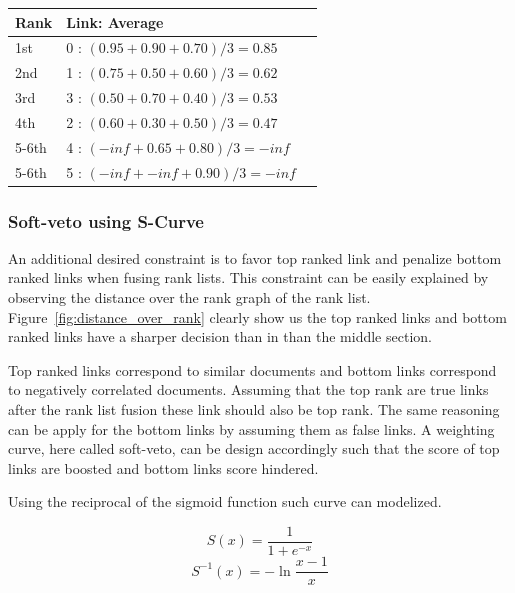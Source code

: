 \begin{table}
  \begin{tabular}{l l l}
    \toprule
    Rank & Link: Average \\
    \midrule
    1st & 0 : $(0.95 + 0.90 + 0.70)/3 = 0.85$ \\
    2nd & 1 : $(0.75 + 0.50 + 0.60)/3 = 0.62$ \\
    3rd & 3 : $(0.50 + 0.70 + 0.40)/3 = 0.53$ \\
    4th & 2 : $(0.60 + 0.30 + 0.50)/3 = 0.47$ \\
    5-6th & 4 : $(-inf + 0.65 + 0.80)/3 = -inf$ \\
    5-6th & 5 : $(-inf + -inf + 0.90)/3 = -inf$ \\
    \bottomrule
  \end{tabular}
\end{table}

\subsubsection{Soft-veto using S-Curve}

An additional desired constraint is to favor top ranked link and penalize bottom ranked links when fusing rank lists.
This constraint can be easily explained by observing the distance over the rank graph of the rank list.
Figure~\ref{fig:distance_over_rank} clearly show us the top ranked links and bottom ranked links have a sharper decision than in than the middle section.

Top ranked links correspond to similar documents and bottom links correspond to negatively correlated documents.
Assuming that the top rank are true links after the rank list fusion these link should also be top rank.
The same reasoning can be apply for the bottom links by assuming them as false links.
A weighting curve, here called soft-veto, can be design accordingly such that the score of top links are boosted and  bottom links score hindered.

Using the reciprocal of the sigmoid function such curve can modelized.

\begin{equation}
  \label{eq:sigmoid}
  S(x) = \frac{1}{1+e^{-x}}
\end{equation}
\begin{equation}
  \label{eq:sigmoid_r}
  S^{-1}(x) = -\ln{\frac{x-1}{x}}
\end{equation}

